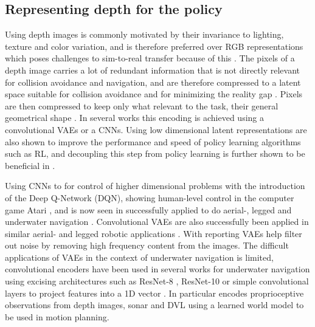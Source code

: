 \subsection{Representing depth for the policy}
\label{sec:rw-representation}
Using depth images is commonly motivated by their invariance to lighting, texture and color variation, and is therefore preferred over RGB representations which poses challenges to sim-to-real transfer because of this \parencite{patel2026defm}. The pixels of a depth image carries a lot of redundant information that is not directly relevant for collision avoidance and navigation, and are therefore compressed to a latent space suitable for collision avoidance and for minimizing the reality gap \parencite{hoeller2021learning}. Pixels are then compressed to keep only what relevant to the task, their general geometrical shape \parencite{hoeller2021learning}. In several works this encoding is achieved using a convolutional VAEs or a CNNs. Using low dimensional latent representations are also shown to improve the performance and speed of  policy learning algorithms such as RL, and decoupling this step from policy learning is further shown to be beneficial in \textcite{raffin2019decoupling}. 

Using CNNs to for control of higher dimensional problems with the introduction of the Deep Q-Network (DQN), showing human-level control in the computer game Atari \parencite{mnih2015human}, and is now seen in successfully applied to do aerial-, legged and underwater navigation \parencite{loquercio2018dronet, agarwal2023legged, yang2022monocular}. Convolutional VAEs are also successfully been applied in similar aerial- and legged robotic applications  \parencite{hoeller2021learning, kulkarni2024dce}. With \textcite{hoeller2021learning} reporting VAEs help filter out noise by removing high frequency content from the images. The difficult applications of VAEs in the context of underwater navigation is limited, convolutional encoders have been used in several works for underwater navigation using excising architectures such as ResNet-8 \parencite{manderson2020vision}, ResNet-10 \parencite{shafer2026endtoend} or simple convolutional layers to project features into a 1D vector \parencite{yang2025duvin}. In particular \textcite{deowan2026unified} encodes proprioceptive observations from depth images, sonar and DVL using a learned world model to be used in motion planning. 

